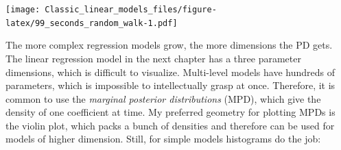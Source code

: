 \documentclass[]{svmono}
\newenvironment{Shaded}{\begin{snugshade}}{\end{snugshade}}
\newcommand{\KeywordTok}[1]{\textcolor[rgb]{0.13,0.29,0.53}{\textbf{#1}}}
\newcommand{\DataTypeTok}[1]{\textcolor[rgb]{0.13,0.29,0.53}{#1}}
\newcommand{\DecValTok}[1]{\textcolor[rgb]{0.00,0.00,0.81}{#1}}
\newcommand{\StringTok}[1]{\textcolor[rgb]{0.31,0.60,0.02}{#1}}
\newcommand{\OperatorTok}[1]{\textcolor[rgb]{0.81,0.36,0.00}{\textbf{#1}}}
\newcommand{\NormalTok}[1]{#1}
\theoremstyle{definition}
\theoremstyle{definition}
\theoremstyle{definition}
\theoremstyle{remark}
\begin{document}
\begin{Shaded}
\end{Shaded}

\texttt{[image: Classic\_linear\_models\_files/figure-latex/99\_seconds\_random\_walk-1.pdf]}

The more complex regression models grow, the more dimensions the PD
gets. The linear regression model in the next chapter has a three
parameter dimensions, which is difficult to visualize. Multi-level
models have hundreds of parameters, which is impossible to
intellectually grasp at once. Therefore, it is common to use the
\emph{marginal posterior distributions} (MPD), which give the density of
one coefficient at time. My preferred geometry for plotting MPDs is the
violin plot, which packs a bunch of densities and therefore can be used
for models of higher dimension. Still, for simple models histograms do
the job:

\begin{Shaded}
\end{Shaded}
\end{document}
